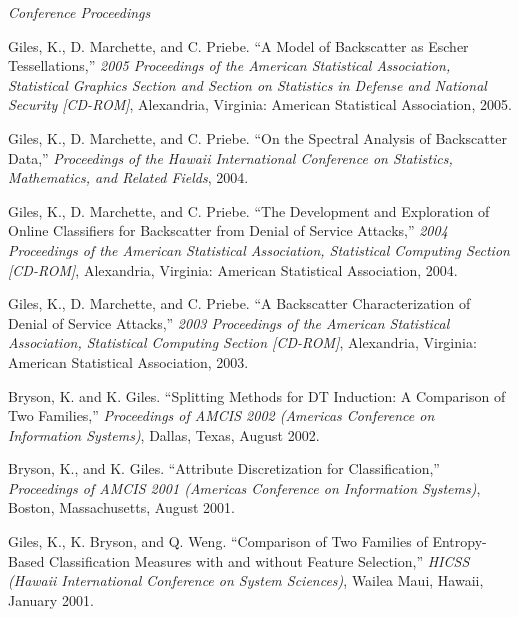 \documentclass[11pt,article,oneside]{memoir}
\begin{document}
\bigskip

\noindent\emph{Conference Proceedings \vspace{0.05in}}
 

\ind Giles, K., D. Marchette, and C. Priebe. “A Model of Backscatter as Escher Tessellations,” \emph{2005 Proceedings of the American Statistical Association, Statistical Graphics Section and Section on Statistics in Defense and National Security [CD-ROM]}, Alexandria, Virginia: American Statistical Association, 2005.

\ind Giles, K., D. Marchette, and C. Priebe. “On the Spectral Analysis of Backscatter Data,” \emph{Proceedings of the Hawaii International Conference on Statistics, Mathematics, and Related Fields}, 2004.

\ind Giles, K., D. Marchette, and C. Priebe. “The Development and Exploration of Online Classifiers for Backscatter from Denial of Service Attacks,” \emph{2004 Proceedings of the American Statistical Association, Statistical Computing Section [CD-ROM]}, Alexandria, Virginia: American Statistical Association, 2004.



\ind Giles, K., D. Marchette, and C. Priebe. “A Backscatter Characterization of Denial of Service Attacks,” \emph{2003 Proceedings of the American Statistical Association, Statistical Computing Section [CD-ROM]}, Alexandria, Virginia: American Statistical Association, 2003.


\ind Bryson, K. and K. Giles. “Splitting Methods for DT Induction: A Comparison of Two Families,” \emph{Proceedings of AMCIS 2002 (Americas Conference on Information Systems)}, Dallas, Texas, August 2002.

\ind Bryson, K., and K. Giles. “Attribute Discretization for Classification,” \emph{Proceedings of AMCIS 2001 (Americas Conference on Information Systems)}, Boston, Massachusetts, August 2001.

\ind Giles, K., K. Bryson, and Q. Weng. “Comparison of Two Families of Entropy-Based Classification Measures with and without Feature Selection,” \emph{HICSS (Hawaii International Conference on System Sciences)}, Wailea Maui, Hawaii, January 2001.
\end{document}
